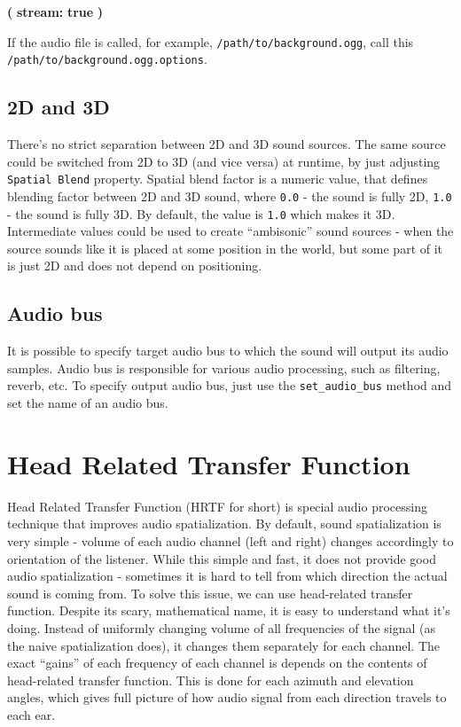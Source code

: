 \documentclass[
]{book}
\newenvironment{Shaded}{\begin{snugshade}}{\end{snugshade}}
\newcommand{\ErrorTok}[1]{\textcolor[rgb]{0.64,0.00,0.00}{\textbf{#1}}}
\theoremstyle{definition}
\theoremstyle{definition}
\theoremstyle{definition}
\theoremstyle{definition}
\theoremstyle{remark}
\begin{document}
\begin{Shaded}
\begin{Highlighting}[]
\ErrorTok{(}
  \ErrorTok{stream:} \ErrorTok{true}
\ErrorTok{)}
\end{Highlighting}
\end{Shaded}

If the audio file is called, for example, \texttt{/path/to/background.ogg}, call this \texttt{/path/to/background.ogg.options}.

\subsection{2D and 3D}\label{d-and-3d}

There's no strict separation between 2D and 3D sound sources. The same source could be switched from 2D to 3D (and vice versa) at runtime, by just adjusting \texttt{Spatial\ Blend} property. Spatial blend factor is a numeric value, that defines blending factor between 2D and 3D sound, where \texttt{0.0} - the sound is fully 2D, \texttt{1.0} - the sound is fully 3D. By default, the value is \texttt{1.0} which makes it 3D. Intermediate values could be used to create ``ambisonic'' sound sources - when the source sounds like it is placed at some position in the world, but some part of it is just 2D and does not depend on positioning.

\subsection{Audio bus}\label{audio-bus-1}

It is possible to specify target audio bus to which the sound will output its audio samples. Audio bus is responsible for various audio processing, such as filtering, reverb, etc. To specify output audio bus, just use the \texttt{set\_audio\_bus} method and set the name of an audio bus.

\section{Head Related Transfer Function}\label{head-related-transfer-function}

Head Related Transfer Function (HRTF for short) is special audio processing technique that improves audio spatialization. By default, sound spatialization is very simple - volume of each audio channel (left and right) changes accordingly to orientation of the listener. While this simple and fast, it does not provide good audio spatialization - sometimes it is hard to tell from which direction the actual sound is coming from. To solve this issue, we can use head-related transfer function. Despite its scary, mathematical name, it is easy to understand what it's doing. Instead of uniformly changing volume of all frequencies of the signal (as the naive spatialization does), it changes them separately for each channel. The exact ``gains'' of each frequency of each channel is depends on the contents of head-related transfer function. This is done for each azimuth and elevation angles, which gives full picture of how audio signal from each direction travels to each ear.
\end{document}
